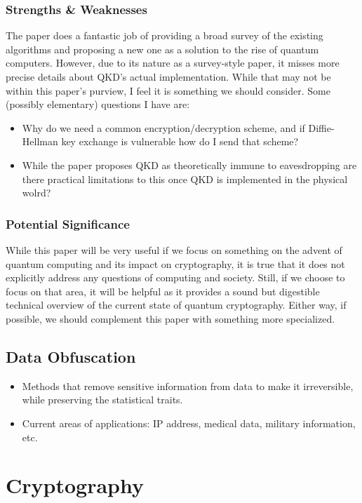 \documentclass{article}
\begin{document}
\subsubsection*{Strengths \& Weaknesses}
The paper does a fantastic job of providing a broad survey of the existing algorithms and proposing a new one as a solution to the rise of quantum computers.
However, due to its nature as a survey-style paper, it misses more precise details about QKD's actual implementation.
While that may not be within this paper's purview, I feel it is something we should consider.
Some (possibly elementary) questions I have are:
\begin{itemize}
    \item Why do we need a common encryption/decryption scheme, and if Diffie-Hellman key exchange is vulnerable how do I send that scheme?
    \item While the paper proposes QKD as theoretically immune to eavesdropping are there practical limitations to this once QKD is implemented in the physical wolrd?
\end{itemize}

\subsubsection*{Potential Significance}
While this paper will be very useful if we focus on something on the advent of quantum computing and its impact on cryptography, it is true that it does not explicitly address any questions of computing and society.
Still, if we choose to focus on that area, it will be helpful as it provides a sound but digestible technical overview of the current state of quantum cryptography.
Either way, if possible, we should complement this paper with something more specialized.

\subsection{Data Obfuscation} \cite{data_obfuscation}
    \begin{itemize}
        \item Methods that remove sensitive information from data to make it irreversible, while preserving the statistical traits.
        \item Current areas of applications: IP address, medical data, military information, etc.
    \end{itemize}

\section{Cryptography}
\end{document}
